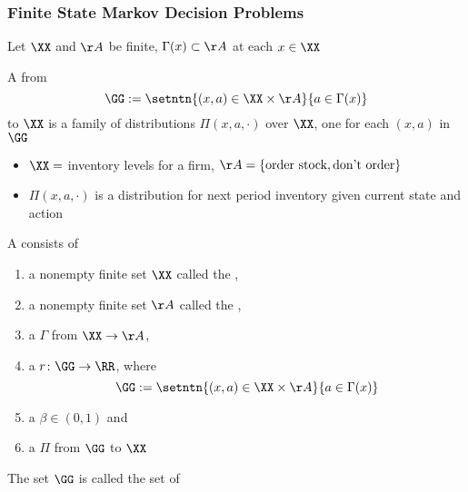\begin{frame}
    \frametitle{Finite State Markov Decision Problems}

    Let $\XX$ and $\AA$ be finite, $\Gamma(x) \subset \AA$ at each $x \in \XX$

    A  from 
    $$ \GG := \setntn{(x, a) \in \XX \times \AA}{a \in \Gamma(x)} $$
    to $\XX$ is a family of distributions $\Pi(x, a, \cdot)$ over $\XX$, one for each $(x, a)$ in $\GG$
    
        \vspace{0.5em}
        \vspace{0.5em}
    \Eg
    \begin{itemize}
        \item $\XX =$ inventory levels for a firm, $\AA = \{\text{order stock}, \text{don't order}\}$
        \item $\Pi(x, a, \cdot)$ is a distribution for next period inventory given current state and action
    \end{itemize}

\end{frame}




\begin{frame}

    A  consists of 
    \begin{enumerate}
        \item a nonempty finite set $\XX$ called the ,
        \vspace{0.2em}
        \item a nonempty finite set $\AA$ called the ,
        \vspace{0.2em}
        \item a 
            $\Gamma$ from $\XX \to \AA$,
        \vspace{0.2em}
        \item a  $r \colon \GG \to \RR$, where
            \begin{equation*}
                \GG := \setntn{(x, a) \in \XX \times \AA}{a \in \Gamma(x)}
            \end{equation*}
        \item a  $\beta \in (0, 1)$ and
        \vspace{0.2em}
        \item a  $\Pi$ from $\GG$ to $\XX$ 
    \end{enumerate}

        \vspace{0.5em}
        The set $\GG$ is called the set of 

\end{frame}


